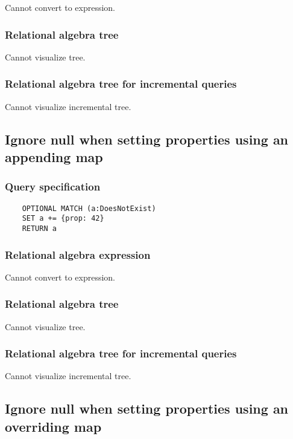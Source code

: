 	Cannot convert to expression.

	\subsubsection*{Relational algebra tree}

	Cannot visualize tree.

	\subsubsection*{Relational algebra tree for incremental queries}

	Cannot visualize incremental tree.
	\subsection{Ignore null when setting properties using an appending map}

	\subsubsection*{Query specification}

	\begin{lstlisting}
	OPTIONAL MATCH (a:DoesNotExist)
	SET a += {prop: 42}
	RETURN a
	\end{lstlisting}


	\subsubsection*{Relational algebra expression}

	Cannot convert to expression.

	\subsubsection*{Relational algebra tree}

	Cannot visualize tree.

	\subsubsection*{Relational algebra tree for incremental queries}

	Cannot visualize incremental tree.
	\subsection{Ignore null when setting properties using an overriding map}

